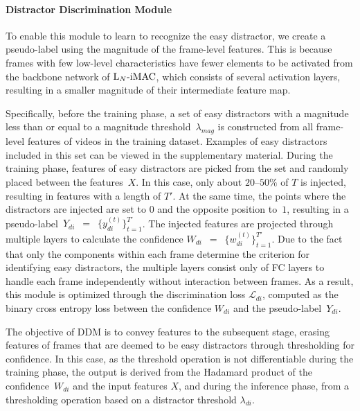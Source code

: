 \documentclass[10pt,twocolumn,letterpaper]{article}
\begin{document}
        \paragraph{Distractor Discrimination Module \\}
            To enable this module to learn to recognize the easy distractor, we create a pseudo-label using the magnitude of the frame-level features. This is because frames with few low-level characteristics have fewer elements to be activated from the backbone network of $\textup{L}_{N}\textup{-iMAC}$, which consists of several activation layers, resulting in a smaller magnitude of their intermediate feature map. 
            
            Specifically, before the training phase, a set of easy distractors with a magnitude less than or equal to a magnitude threshold~$\lambda_{mag}$ is constructed from all frame-level features of videos in the training dataset. Examples of easy distractors included in this set can be viewed in the supplementary material. During the training phase, features of easy distractors are picked from the set and randomly placed between the features~$X$. In this case, only about $20$–$50\%$ of $T$ is injected, resulting in features with a length of $T'$. At the same time, the points where the distractors are injected are set to $0$ and the opposite position to~$1$, resulting in a pseudo-label~$Y_{di}$~$=$~$\{ y^{(t)}_{di}  \}^{T'}_{t=1}$. The injected features are projected through multiple layers to calculate the confidence $W_{di}$~$=$~$\{ w^{(t)}_{di} \}^{T'}_{t=1}$. Due to the fact that only the components within each frame determine the criterion for identifying easy distractors, the multiple layers consist only of FC layers to handle each frame independently without interaction between frames. As a result, this module is optimized through the discrimination loss $\mathcal{L}_{di}$, computed as the binary cross entropy loss between the confidence $W_{di}$ and the pseudo-label~$Y_{di}$. 
            
            The objective of DDM is to convey features to the subsequent stage, erasing features of frames that are deemed to be easy distractors through thresholding for confidence. In this case, as the threshold operation is not differentiable during the training phase, the output is derived from the Hadamard product of the confidence~$W_{di}$ and the input features $X$, and during the inference phase, from a thresholding operation based on a distractor threshold $\lambda_{di}$.
        
\end{document}
